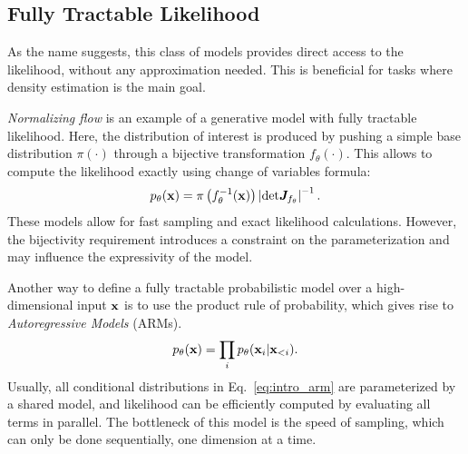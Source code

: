 \subsection{Fully Tractable Likelihood}
As the name suggests, this class of models provides direct access to the likelihood, without any approximation needed. This is beneficial for tasks where density estimation is the main goal.

\textit{Normalizing flow} is an example of a generative model with fully tractable likelihood. Here, the distribution of interest is produced by pushing a simple base distribution $\pi(\cdot)$ through a bijective transformation $f_{\theta}(\cdot)$. This allows to compute the likelihood exactly using change of variables formula:
\begin{equation}\label{eq:intro_nf}
    p_{\theta}(\rvx) = \pi\left(f^{-1}_{\theta}(\rvx)\right) \left|\text{det}\mJ_{f_{\theta}}  \right|^{-1}.
\end{equation}
These models allow for fast sampling and exact likelihood calculations. However, the bijectivity requirement introduces a constraint on the parameterization and may influence the expressivity of the model. 

Another way to define a fully tractable probabilistic model over a high-dimensional input ${\mathbf{x}}$ is to use the product rule of probability, which gives rise to \textit{Autoregressive Models} (ARMs).  
\begin{equation}\label{eq:intro_arm}
    p_{\theta}(\rvx) = \prod_{i}p_{\theta}(\rvx_i | \rvx_{<i}).
\end{equation}
Usually, all conditional distributions in Eq.~\ref{eq:intro_arm} are parameterized by a shared model, and likelihood can be efficiently computed by evaluating all terms in parallel. The bottleneck of this model is the speed of sampling, which can only be done sequentially, one dimension at a time.


